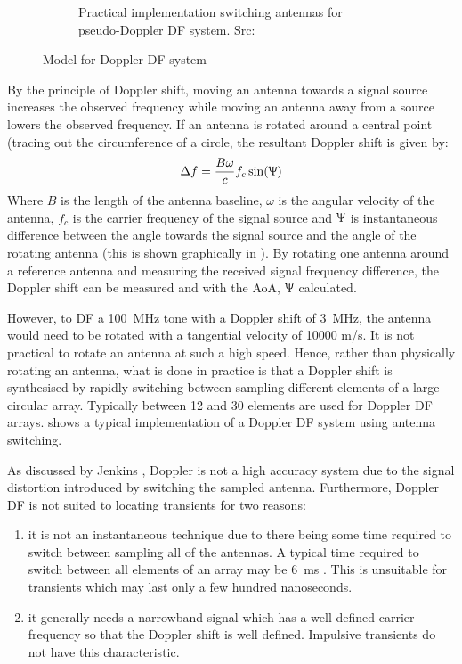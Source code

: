 \begin{figure}
\begin{subfigure}[b]{0.48\textwidth}
    \caption{Practical implementation switching antennas for pseudo-Doppler DF system. Src: \cite{jenkins1991smallaperture}}
  \end{subfigure}
  \caption{Model for Doppler DF system}
  \label{fig:lit-review-doppler-switching}
\end{figure}

By the principle of Doppler shift, moving an antenna towards a signal source increases the observed frequency while moving an antenna away from a source lowers the observed frequency. 
If an antenna is rotated around a central point (tracing out the circumference of a circle, the resultant Doppler shift is given by: \cite{poisel2012electronic}
\begin{equation} \label{eq:lit-review:doppler}
  \Delta f = \frac{B\omega}{c}f_c\sin(\Uppsi)
\end{equation}
Where \(B\) is the length of the antenna baseline, \(\omega\) is the angular velocity of the antenna, \(f_c\) is the carrier frequency of the signal source and \(\Uppsi\) is instantaneous difference between the angle towards the signal source and the angle of the rotating antenna (this is shown graphically in ). By rotating one antenna around a reference antenna and measuring the received signal frequency difference, the Doppler shift can be measured and with  the AoA, \(\Uppsi\)  calculated.

However, to DF a \SI{100}{\mega\hertz} tone with a Doppler shift of \SI{3}{\mega\hertz}, the antenna would need to be rotated with a tangential velocity of 10000 m/s\cite{jenkins1991smallaperture}. 
It is not practical to rotate an antenna at such a high speed. 
Hence, rather than physically rotating an antenna, what is done in practice is that a Doppler shift is synthesised by rapidly switching between sampling different elements of a large circular array. 
Typically between 12 and 30 elements are used for Doppler DF arrays. 
 shows a typical implementation of a Doppler DF system using antenna switching.

As discussed by Jenkins \cite{jenkins1991smallaperture}, Doppler is not a high accuracy system due to the signal distortion introduced by switching the sampled antenna. Furthermore, Doppler DF is not suited to locating transients for two reasons:
\begin{enumerate}
  \item it is not an instantaneous technique due to there being some time required to switch between sampling all of the antennas. A typical time required to switch between all elements of an array may be \SI{6}{\milli\second} \cite{rhode2000introtodf}. This is unsuitable for transients which may last only a few hundred nanoseconds.
  \item it generally needs a narrowband signal which has a well defined carrier frequency so that the Doppler shift is well defined. Impulsive transients do not have this characteristic.
\end{enumerate}

